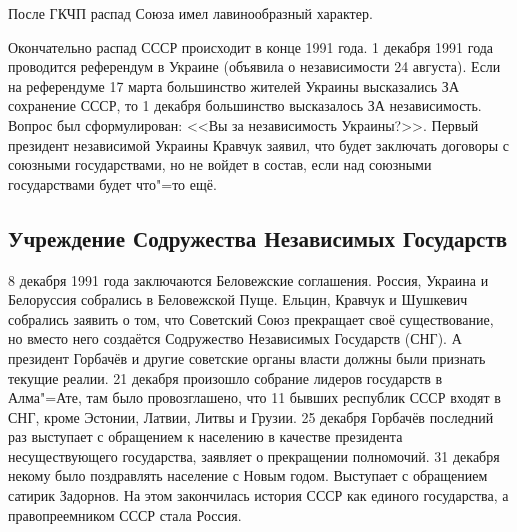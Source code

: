 После ГКЧП распад Союза имел лавинообразный характер.

Окончательно распад СССР происходит в конце 1991 года. 1 декабря 1991 года проводится референдум в Украине (объявила о независимости 24 августа). Если на референдуме 17 марта большинство жителей Украины высказались ЗА сохранение СССР, то 1 декабря большинство высказалось ЗА независимость. Вопрос был сформулирован: <<Вы за независимость Украины?>>. Первый президент независимой Украины Кравчук заявил, что будет заключать договоры с союзными государствами, но не войдет в состав, если над союзными государствами будет что"=то ещё. 

\subsection{Учреждение Содружества Независимых Государств}

8 декабря 1991 года заключаются Беловежские соглашения. Россия, Украина и Белоруссия собрались в Беловежской Пуще. Ельцин, Кравчук и Шушкевич собрались заявить о том, что Советский Союз прекращает своё существование, но вместо него создаётся Содружество Независимых Государств (СНГ). А президент Горбачёв и другие советские органы власти должны были признать текущие реалии. 
21 декабря произошло собрание лидеров государств в Алма"=Ате, там было провозглашено, что 11 бывших республик СССР входят в СНГ, кроме Эстонии, Латвии, Литвы и Грузии. 25 декабря Горбачёв последний раз выступает с обращением к населению в качестве президента несуществующего государства, заявляет о прекращении полномочий. 31 декабря некому было поздравлять население с Новым годом. Выступает с обращением сатирик Задорнов. На этом закончилась история СССР как единого государства, а правопреемником СССР стала Россия.
